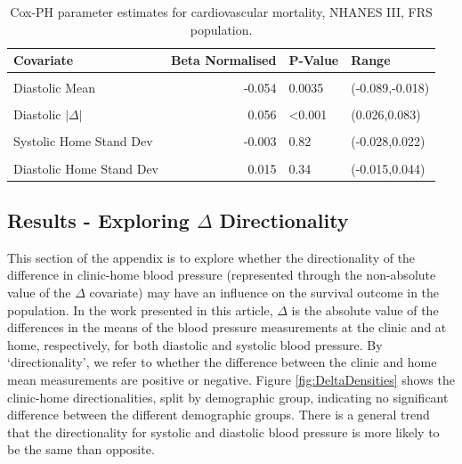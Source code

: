 \documentclass[
]{article}
\begin{document}
\begin{table}[!h]

\caption{\label{tab:freqCVDF}Cox-PH parameter estimates for cardiovascular mortality, NHANES III, FRS population.}
\centering
\begin{tabular}[t]{lrll}
\toprule
Covariate & Beta Normalised & P-Value & Range\\
\midrule
\cellcolor{gray!6}{Systolic Mean} & \cellcolor{gray!6}{0.171} & \cellcolor{gray!6}{<0.001} & \cellcolor{gray!6}{(0.13,0.21)}\\
Diastolic Mean & -0.054 & 0.0035 & (-0.089,-0.018)\\
\cellcolor{gray!6}{Systolic $|\Delta|$} & \cellcolor{gray!6}{0.045} & \cellcolor{gray!6}{<0.001} & \cellcolor{gray!6}{(0.02,0.07)}\\
Diastolic $|\Delta|$ & 0.056 & <0.001 & (0.026,0.083)\\
\cellcolor{gray!6}{Systolic Clinic Stand Dev} & \cellcolor{gray!6}{-0.009} & \cellcolor{gray!6}{0.5} & \cellcolor{gray!6}{(-0.033,0.017)}\\
Systolic Home Stand Dev & -0.003 & 0.82 & (-0.028,0.022)\\
\cellcolor{gray!6}{Diastolic Clinic Stand Dev} & \cellcolor{gray!6}{-0.006} & \cellcolor{gray!6}{0.67} & \cellcolor{gray!6}{(-0.035,0.023)}\\
Diastolic Home Stand Dev & 0.015 & 0.34 & (-0.015,0.044)\\
\bottomrule
\end{tabular}
\end{table}

\hypertarget{results---exploring-delta-directionality}{%
\subsection{\texorpdfstring{Results - Exploring \(\Delta\) Directionality}{Results - Exploring \textbackslash Delta Directionality}}\label{results---exploring-delta-directionality}}

This section of the appendix is to explore whether the directionality of the difference in clinic-home blood pressure (represented through the non-absolute value of the \(\Delta\) covariate) may have an influence on the survival outcome in the population. In the work presented in this article, \(\Delta\) is the absolute value of the differences in the means of the blood pressure measurements at the clinic and at home, respectively, for both diastolic and systolic blood pressure. By `directionality', we refer to whether the difference between the clinic and home mean measurements are positive or negative. Figure \ref{fig:DeltaDensities} shows the clinic-home directionalities, split by demographic group, indicating no significant difference between the different demographic groups. There is a general trend that the directionality for systolic and diastolic blood pressure is more likely to be the same than opposite.
\end{document}
